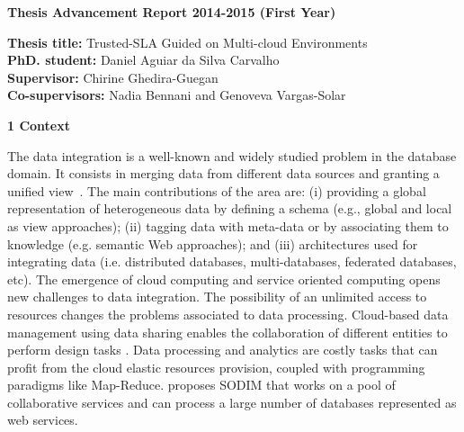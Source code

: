 \documentclass[11pt,a4paper,oneside]{report}
\author{Daniel Aguiar da Silva Carvalho}
\begin{document}
\sffamily
\begin{center}
\textbf{\large{Thesis Advancement Report 2014-2015 (First Year)}}
\end{center}

\begin{flushleft}
\textbf{Thesis title:} Trusted-SLA Guided on Multi-cloud Environments \\
\textbf{PhD. student:} Daniel Aguiar da Silva Carvalho \\
\textbf{Supervisor:} Chirine Ghedira-Guegan \\ 
\textbf{Co-supervisors:} Nadia Bennani and Genoveva Vargas-Solar
\end{flushleft}


\begin{flushleft}
\textbf{1 Context}\\
\end{flushleft} 
The data integration is a well-known and widely studied problem in the database domain. 
It consists in merging data from different data sources and granting a unified view~\cite{Lenzerini:2002}. 
%
The main contributions of the area are: (i) providing a global  representation of heterogeneous data  by defining a schema (e.g., global and local as view approaches); (ii) tagging data with meta-data or by associating them to knowledge (e.g. semantic Web approaches); and (iii)   architectures used for integrating data (i.e. distributed databases, multi-databases,  federated databases, etc).
%
The emergence of cloud computing and service oriented computing opens new challenges to data integration. 
The possibility of an unlimited access to resources  changes the problems associated to data processing. Cloud-based data management using data sharing  enables the collaboration of different entities to perform design tasks \cite{Gonzalez:2010,Gonzalez:2010b}. Data processing and analytics are costly tasks that can profit from the cloud elastic resources provision, coupled with  programming paradigms like Map-Reduce. \cite{078} proposes SODIM that works on a pool of collaborative services and can process a large number of databases represented as web services. 

\end{document}

